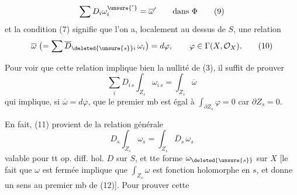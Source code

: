 \[
 \sum D_i\omega^{\unsure{'}}_i=\overline\omega'\qquad\text{dans }\Phi
 \tag*{(9)}
\]
et la condition (7) signifie que l'on a, localement au dessus de $S$, une relation
\[
 \overline\omega\; \bigl(=\sum\overline D_{\deleted{\unsure{s}}i}\,\omega_i\bigr)=d\varphi,\qquad
 \varphi\in\Gamma(X,\mathcal O_X).\tag*{(10)}
\]

Pour voir que cette relation implique bien la nullité de (3), il suffit de prouver
\[
 \sum_i D_{i\,s}\int_{Z_s}\omega_{i\,s}=\int_{Z_s}\overline\omega
 \tag*{(11)}
\]
qui implique, si $\overline\omega=d\varphi$, que le premier mb est égal à $\int_{\partial Z_s}\varphi=0$ car $\partial Z_s=0$.

En fait, (11) provient de la relation générale
\[
 D_s\int_{Z_s}\omega_s=\int_{Z_s}\overline D_s\,\omega_s
 \tag*{(12)}
\]
valable pour tt op. diff. hol. $D$ sur $S$, et tte forme  $\omega_{\deleted{\unsure{s}}}$ sur $X$ [le fait que $\omega$ est fermée implique que $\int_{Z_s}\omega$ est fonction holomorphe en $s$, et donne un sens au premier mb de (12)]. Pour prouver cette
